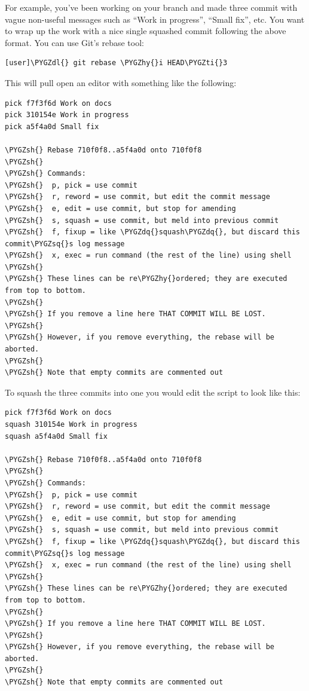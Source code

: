 \documentclass[letterpaper,10pt,english]{sphinxmanual}
\def\PYGZsh{\char`\#}
\def\PYGZdl{\char`\$}
\def\PYGZhy{\char`\-}
\def\PYGZsq{\char`\'}
\def\PYGZdq{\char`\"}
\def\PYGZti{\char`\~}
\begin{document}
For example, you've been working on your branch and made three commit
with vague non-useful messages such as ``Work in progress'', ``Small
fix'', etc. You want to wrap up the work with a nice single squashed
commit following the above format. You can use Git's rebase tool:

\begin{Verbatim}[commandchars=\\\{\}]
[user]\PYGZdl{} git rebase \PYGZhy{}i HEAD\PYGZti{}3
\end{Verbatim}

This will pull open an editor with something like the following:

\begin{Verbatim}[commandchars=\\\{\}]
pick f7f3f6d Work on docs
pick 310154e Work in progress
pick a5f4a0d Small fix

\PYGZsh{} Rebase 710f0f8..a5f4a0d onto 710f0f8
\PYGZsh{}
\PYGZsh{} Commands:
\PYGZsh{}  p, pick = use commit
\PYGZsh{}  r, reword = use commit, but edit the commit message
\PYGZsh{}  e, edit = use commit, but stop for amending
\PYGZsh{}  s, squash = use commit, but meld into previous commit
\PYGZsh{}  f, fixup = like \PYGZdq{}squash\PYGZdq{}, but discard this commit\PYGZsq{}s log message
\PYGZsh{}  x, exec = run command (the rest of the line) using shell
\PYGZsh{}
\PYGZsh{} These lines can be re\PYGZhy{}ordered; they are executed from top to bottom.
\PYGZsh{}
\PYGZsh{} If you remove a line here THAT COMMIT WILL BE LOST.
\PYGZsh{}
\PYGZsh{} However, if you remove everything, the rebase will be aborted.
\PYGZsh{}
\PYGZsh{} Note that empty commits are commented out
\end{Verbatim}

To squash the three commits into one you would edit the script to look
like this:

\begin{Verbatim}[commandchars=\\\{\}]
pick f7f3f6d Work on docs
squash 310154e Work in progress
squash a5f4a0d Small fix

\PYGZsh{} Rebase 710f0f8..a5f4a0d onto 710f0f8
\PYGZsh{}
\PYGZsh{} Commands:
\PYGZsh{}  p, pick = use commit
\PYGZsh{}  r, reword = use commit, but edit the commit message
\PYGZsh{}  e, edit = use commit, but stop for amending
\PYGZsh{}  s, squash = use commit, but meld into previous commit
\PYGZsh{}  f, fixup = like \PYGZdq{}squash\PYGZdq{}, but discard this commit\PYGZsq{}s log message
\PYGZsh{}  x, exec = run command (the rest of the line) using shell
\PYGZsh{}
\PYGZsh{} These lines can be re\PYGZhy{}ordered; they are executed from top to bottom.
\PYGZsh{}
\PYGZsh{} If you remove a line here THAT COMMIT WILL BE LOST.
\PYGZsh{}
\PYGZsh{} However, if you remove everything, the rebase will be aborted.
\PYGZsh{}
\PYGZsh{} Note that empty commits are commented out
\end{Verbatim}
\end{document}

